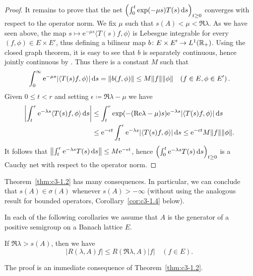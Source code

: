 \begin{proof}
It remains to prove that the net $\left(\int_{0}^t \exp(-\mu s)T(s) \mathop{}\!\mathrm{d}{s} \right)_{t\geq 0}$ converges with respect to the operator norm.
We fix $\mu$ such that $s(A) < \mu < \Re  \lambda$.
As we have seen above, the map $s \mapsto \mathrm{e}^{-\mu s}\langle T(s)f,\phi\rangle$ is Lebesgue integrable for every $(f,\phi) \in E \times E'$, thus defining a bilinear map $b \colon E \times E' \to L^1(\mathbb{R} _{+})$.
Using the closed graph theorem, it is easy to see that $b$ is separately continuous, hence jointly continuous by \citet[III.Theorem~5.1]{schaefer:1966}.
Thus there is a constant $M$ such that
\begin{equation}\label{eq:c3-1.4}
	\int_{0}^{\infty} \mathrm{e}^{-\mu s}|\langle T(s)f,\phi\rangle| \mathop{}\!\mathrm{d}{s}  = \|b(f,\phi)\| \leq M\|f\|\|\phi\| \quad (f \in E, \phi \in E')\,.
\end{equation}
Given $0 \leq t < r$ and setting $\epsilon \coloneqq \Re  \lambda - \mu$ we have
\begin{align*}
	\left|\int_{t}^r \mathrm{e}^{-\lambda s}\langle T(s)f,\phi\rangle \mathop{}\!\mathrm{d}{s} \right| &\leq \int_{t}^r \exp(-(\mathop{}\!\mathrm{Re} \lambda-\mu)s)\mathrm{e}^{-\lambda s}|\langle T(s)f,\phi\rangle| \mathop{}\!\mathrm{d}{s}  \\
	&\leq \mathrm{e}^{-\epsilon t}\int_{t}^r \mathrm{e}^{-\lambda s}|\langle T(s)f,\phi\rangle| \mathop{}\!\mathrm{d}{s}  \leq \mathrm{e}^{-\epsilon t} M\|f\|\|\phi\|.
\end{align*}
It follows that $\left\|\int_{t}^r \mathrm{e}^{-\lambda s}T(s) \mathop{}\!\mathrm{d}{s} \right\| \leq M\mathrm{e}^{-\epsilon t}$, hence $\left(\int_{0}^t \mathrm{e}^{-\lambda s}T(s) \mathop{}\!\mathrm{d}{s} \right)_{t\geq 0}$ is a Cauchy net with respect to the operator norm.
\end{proof}
Theorem~\ref{thm:c3-1.2} has many consequences.
In particular, we can conclude that $s(A) \in \sigma(A)$ whenever $s(A) > -\infty$ (without using the analogous result for bounded operators, \cf Corollary~\ref{cor:c3-1.4} below).

In each of the following corollaries we assume that $A$ is the generator of a positive semigroup on a Banach lattice $E$.

\begin{corollary}\label{cor:c3-1.3}
If $\Re  \lambda > s(A)$, then we have
\begin{equation}\label{eq:c3-1.5}
	|R(\lambda,A)f| \leq R(\Re \lambda,A) |f| \quad (f \in E).
\end{equation}
\end{corollary}
The proof is an immediate consequence of Theorem~\ref{thm:c3-1.2}.

